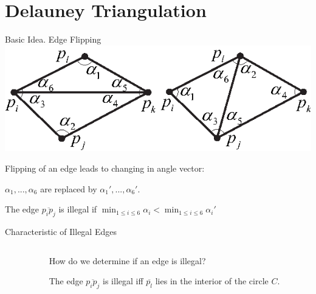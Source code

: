 \documentclass[10pt]{beamer}
\begin{document}
\section{Delauney Triangulation}

\begin{frame}{Basic Idea. Edge Flipping}
	\includegraphics[width=\linewidth]{img/flip_triangle.eps}
	
	Flipping of an edge leads to changing in angle vector:
	
	$\alpha_1,...,\alpha_6$ are replaced by $\alpha_1',...,\alpha_6'$.
	\bigskip	
	
	The edge $\overline{p_ip_j}$ is \alert{illegal} 
	if $\min_{1\leq i \leq6}\alpha_i < \min_{1\leq i \leq6}\alpha_i' $ 

\end{frame}

\begin{frame}{Characteristic of Illegal Edges}
	\begin{columns}
		\begin{column}{0.6\textwidth} 
		\end{column}
		\begin{column}{0.4\textwidth} 
			How do we determine if an edge is illegal?
			\bigskip
	
			The edge $\overline{p_ip_j}$ is illegal iff $\overline{p_l}$ 
			lies in the interior of the circle $C$.
		\end{column}
	\end{columns}
\end{frame}
\end{document}
